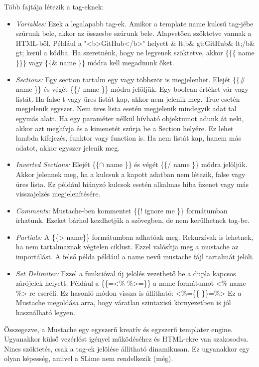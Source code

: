 Több fajtája létezik a tag-eknek:
\begin{itemize}
\item \emph{Variables:}
Ezek a legalapabb tag-ek.
Amikor a template name kulcsú tag-jébe szúrunk bele, akkor az összesbe szúrunk bele.
Alapvetően szöktetve vannak a HTML-ből.
Például a "<b>GitHub</b>" helyett \& lt;b\& gt;GitHub\& lt;/b\& gt; kerül a kódba.
Ha szeretnénk, hogy ne legyenek szöktetve, akkor \{\{\{ name \}\}\} vagy \{\{\& name \}\} módra kell megadnunk őket.
\item \emph{Sections:}
Egy section tartalm egy vagy többször is megjelenhet.
Elejét \{\{\# name \}\} és végét \{\{/ name \}\} módra jelöljük.
Egy boolean értéket vár vagy listát.
Ha false-t vagy üres listát kap, akkor nem jelenik meg.
True esetén megjelenik egyszer.
Nem üres lista esetén megjelenik mindegyik adat tal egymás alatt.
Ha egy paraméter nélkül hívható objektumot adunk át neki, akkor azt meghívja és a kimenetét szúrja be a Section helyére.
Ez lehet lambda kifejezés, funktor vagy function is.
Ha nem listát kap, hanem más adatot, akkor egyszer jelenik meg.
\item \emph{Inverted Sections:}
Elejét \{\{$\cap$ name \}\} és végét \{\{/ name \}\} módra jelöljük.
Akkor jelennek meg, ha a kulcsuk a kapott adatban nem létezik, false vagy üres lista.
Ez például hiányzó kulcsok esetén alkalmas hiba üzenet vagy más visszajelzés megjelenítésére.
\item \emph{Comments:}
Mustache-ben kommentet \{\{! ignore me \}\} formátumban írhatunk.
Ezeket bárhol kezdhetjük a szövegben, de nem kerülhetnek tag-be.
\item \emph{Partials:}
A \{\{> name\}\} formátumban adhatóak meg.
Rekurzívak is lehetnek, ha nem tartalmaznak végtelen ciklust.
Ezzel valósítja meg a mustache az importálást.
A felső példa például a name nevű mustache fájl tartalmát jelöli.
\item \emph{Set Delimiter:}
Ezzel a funkcióval új jelölés vezethető be a dupla kapcsos zárójelek helyett.
Például a \{\{=<\% \%>=\}\} a {{ name }} formátumot <\% name \%> re cseréli.
Ez hasonló módon vissza is állítható: <\%=\{\{ \}\}=\%>
Ez a Mustache megoldása arra, hogy váratlan szintaxisú környezetben is jól használható legyen.
\end{itemize}

Összegezve, a Mustache egy egyszerű kreatív és egyszerű templater engine.
Ugyanakkor külső vezérlést igényel működéséhez és HTML-ekre van szakosodva.
Nincs szöktetés, csak a tag-ek jelölése állítható dinamikusan.
Ez ugyanakkor egy olyan képesség, amivel a SLime nem rendelkezik (még). 



